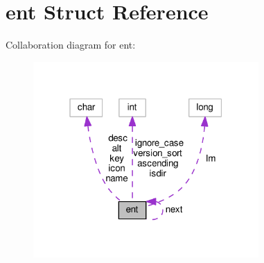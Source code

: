 \hypertarget{structent}{}\section{ent Struct Reference}
\label{structent}


Collaboration diagram for ent\+:
\nopagebreak
\begin{figure}[H]
\begin{center}
\leavevmode
\includegraphics[width=244pt]{structent__coll__graph}
\end{center}
\end{figure}
